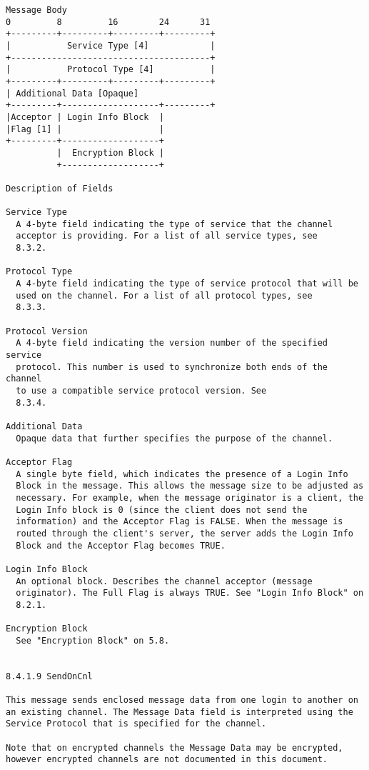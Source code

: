 \documentclass[titlepage,oneside]{book}
\begin{document}
\begin{verbatim}
Message Body
0         8         16        24      31
+---------+---------+---------+---------+
|           Service Type [4]            |
+---------------------------------------+
|           Protocol Type [4]           |
+---------+---------+---------+---------+
| Additional Data [Opaque]
+---------+-------------------+---------+
|Acceptor | Login Info Block  |
|Flag [1] |                   |
+---------+-------------------+
          |  Encryption Block |
          +-------------------+

Description of Fields

Service Type
  A 4-byte field indicating the type of service that the channel
  acceptor is providing. For a list of all service types, see
  8.3.2.

Protocol Type
  A 4-byte field indicating the type of service protocol that will be
  used on the channel. For a list of all protocol types, see
  8.3.3.

Protocol Version
  A 4-byte field indicating the version number of the specified service
  protocol. This number is used to synchronize both ends of the channel
  to use a compatible service protocol version. See 
  8.3.4.

Additional Data
  Opaque data that further specifies the purpose of the channel.

Acceptor Flag
  A single byte field, which indicates the presence of a Login Info
  Block in the message. This allows the message size to be adjusted as
  necessary. For example, when the message originator is a client, the
  Login Info block is 0 (since the client does not send the
  information) and the Acceptor Flag is FALSE. When the message is
  routed through the client's server, the server adds the Login Info
  Block and the Acceptor Flag becomes TRUE.

Login Info Block
  An optional block. Describes the channel acceptor (message
  originator). The Full Flag is always TRUE. See "Login Info Block" on
  8.2.1.

Encryption Block
  See "Encryption Block" on 5.8.


8.4.1.9 SendOnCnl

This message sends enclosed message data from one login to another on
an existing channel. The Message Data field is interpreted using the
Service Protocol that is specified for the channel.

Note that on encrypted channels the Message Data may be encrypted,
however encrypted channels are not documented in this document.


\end{verbatim}
\end{document}
